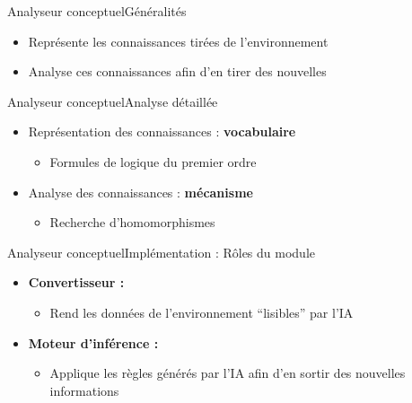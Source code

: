 \begin{frame}{Analyseur conceptuel}{Généralités}
\begin{itemize}
  \item Représente les connaissances tirées de l'environnement
  \item Analyse ces connaissances afin d'en tirer des nouvelles
\end{itemize}
\end{frame}

\begin{frame}{Analyseur conceptuel}{Analyse détaillée}
\begin{itemize}
  \item Représentation des connaissances : \textbf{vocabulaire}
  \begin{itemize}
    \item Formules de logique du premier ordre
  \end{itemize}
  \pause
  \item Analyse des connaissances : \textbf{mécanisme}
  \begin{itemize}
    \item Recherche d'homomorphismes
  \end{itemize}
\end{itemize}
\end{frame}

\begin{frame}{Analyseur conceptuel}{Implémentation : Rôles du module}
\begin{itemize}
  \item \textbf{Convertisseur :}
  \begin{itemize}
    \item Rend les données de l'environnement \enquote{lisibles} par l'IA
  \end{itemize}
  \item \textbf{Moteur d'inférence :}
  \begin{itemize}
    \item Applique les règles générés par l'IA afin d'en
    sortir des nouvelles informations
  \end{itemize}
\end{itemize}
\end{frame}


